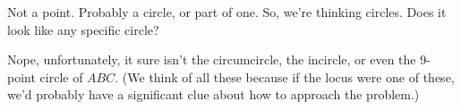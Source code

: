 













Not a point. Probably a circle, or part of one. So, we're thinking circles. Does it look like any specific circle?







Nope, unfortunately, it sure isn't the circumcircle, the incircle, or even the 9-point circle of $ABC.$  (We think of all these because if the locus were one of these, we'd probably have a significant clue about how to approach the problem.)


